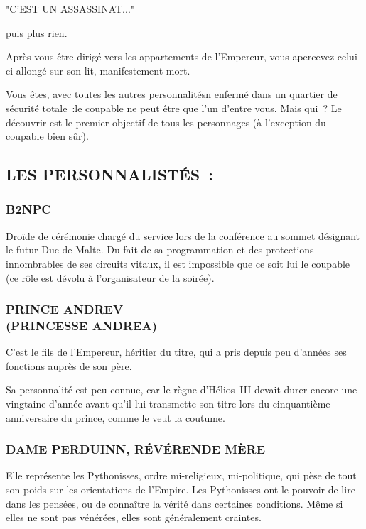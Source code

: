 \documentclass[14pt,twocolumn]{extarticle}
\begin{document}
"C'EST UN ASSASSINAT..."

puis plus rien.

Après vous être dirigé vers les appartements de l'Empereur, vous apercevez
celui-ci allongé sur son lit, manifestement mort.

Vous êtes, avec toutes les autres personnalitésn enfermé dans un quartier de
sécurité totale~:le coupable ne peut être que l'un d'entre vous. Mais qui~?
Le découvrir est le premier objectif de tous les personnages (à l'exception du
coupable bien sûr).

\clearpage

\subsection{LES PERSONNALISTÉS~:}

\subsubsection{B2NPC}

Droïde de cérémonie chargé du service lors de la conférence au sommet désignant
le futur Duc de Malte. Du fait de sa programmation et des protections
innombrables de ses circuits vitaux, il est impossible que ce soit lui le
coupable (ce rôle est dévolu à l'organisateur de la soirée).

\subsubsection{PRINCE ANDREV\\(PRINCESSE ANDREA)}

C'est le fils de l'Empereur, héritier du titre, qui a pris depuis peu d'années
ses fonctions auprès de son père.

Sa personnalité est peu connue, car le règne d'Hélios~III devait durer
encore une vingtaine d'année avant qu'il lui transmette son titre lors du
cinquantième anniversaire du prince, comme le veut la coutume.

\subsubsection{DAME PERDUINN, RÉVÉRENDE MÈRE}

Elle représente les Pythonisses, ordre mi-religieux, mi-politique, qui pèse de
tout son poids sur les orientations de l'Empire. Les Pythonisses ont le pouvoir
de lire dans les pensées, ou de connaître la vérité dans certaines conditions.
Même si elles ne sont pas vénérées, elles sont généralement craintes.
\end{document}
